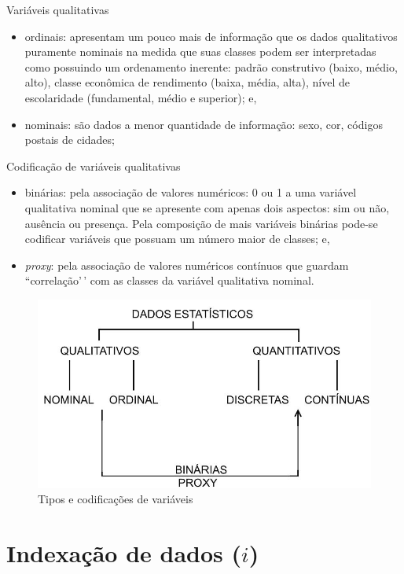 \documentclass[
]{book}
\providecommand{\tightlist}{%
  \setlength{\itemsep}{0pt}\setlength{\parskip}{0pt}}
\begin{document}
Variáveis qualitativas

\begin{itemize}
\tightlist
\item
  ordinais: apresentam um pouco mais de informação que os dados qualitativos puramente nominais na medida que suas classes podem ser interpretadas como possuindo um ordenamento inerente: padrão construtivo (baixo, médio, alto), classe econômica de rendimento (baixa, média, alta), nível de escolaridade (fundamental, médio e superior); e,
\item
  nominais: são dados a menor quantidade de informação: sexo, cor, códigos postais de cidades;
\end{itemize}

Codificação de variáveis qualitativas

\begin{itemize}
\tightlist
\item
  binárias: pela associação de valores numéricos: 0 ou 1 a uma variável qualitativa nominal que se apresente com apenas dois aspectos: sim ou não, ausência ou presença. Pela composição de mais variáveis binárias pode-se codificar variáveis que possuam um número maior de classes; e,
\item
  \emph{proxy}: pela associação de valores numéricos contínuos que guardam ``correlação'\,' com as classes da variável qualitativa nominal.
\end{itemize}

\begin{figure}

{\centering \includegraphics[width=0.75\linewidth]{images2/tipos_variaveis} 

}

\caption{Tipos e codificações de variáveis }\label{fig:unnamed-chunk-7}
\end{figure}

\hypertarget{indexauxe7uxe3o-de-dados-i}{%
\section{\texorpdfstring{Indexação de dados (\(i\))}{Indexação de dados (i)}}\label{indexauxe7uxe3o-de-dados-i}}
\end{document}
